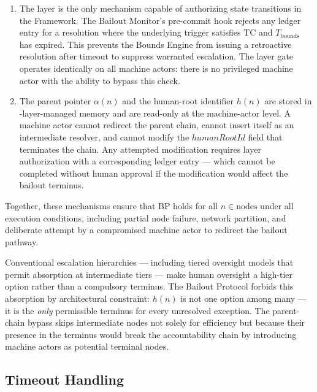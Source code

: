 \begin{enumerate}
\item[\textbf{Fact Layer gate.}] The \fact{} layer is the only mechanism capable of authorizing state transitions in the \bxthree{} Framework. The Bailout Monitor's pre-commit hook rejects any ledger entry for a resolution where the underlying trigger satisfies TC and $T_{\text{bounds}}$ has expired. This prevents the Bounds Engine from issuing a retroactive resolution after timeout to suppress warranted escalation. The \fact{} layer gate operates identically on all machine actors: there is no privileged machine actor with the ability to bypass this check.

\item[\textbf{Immutable parent-pointer and human-root architecture.}] The parent pointer $\alpha(n)$ and the human-root identifier $h(n)$ are stored in \fact-layer-managed memory and are read-only at the machine-actor level. A machine actor cannot redirect the parent chain, cannot insert itself as an intermediate resolver, and cannot modify the $humanRootId$ field that terminates the chain. Any attempted modification requires \purpose{} layer authorization with a corresponding ledger entry — which cannot be completed without human approval if the modification would affect the bailout terminus.
\end{enumerate}

Together, these mechanisms ensure that BP holds for all $n \in \text{nodes}$ under all execution conditions, including partial node failure, network partition, and deliberate attempt by a compromised machine actor to redirect the bailout pathway.

Conventional escalation hierarchies — including tiered oversight models that permit absorption at intermediate tiers — make human oversight a high-tier option rather than a compulsory terminus. The Bailout Protocol forbids this absorption by architectural constraint: $h(n)$ is not one option among many — it is the \emph{only} permissible terminus for every unresolved exception. The parent-chain bypass skips intermediate nodes not solely for efficiency but because their presence in the terminus would break the accountability chain by introducing machine actors as potential terminal nodes.

\subsection{Timeout Handling}\label{sec:timeout-handling}

